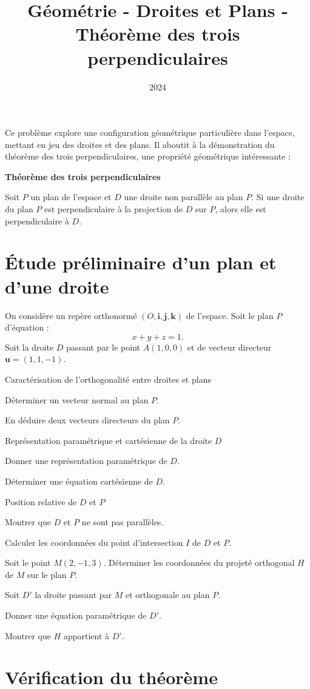 \documentclass[10pt,a4paper]{article}
\title{Géométrie - Droites et Plans - Théorème des trois perpendiculaires}
\author{}
\date{2024}
\begin{document}
Ce problème explore une configuration géométrique particulière dans l'espace, mettant en jeu des
droites et des plans. Il aboutit à la démonstration du théorème des trois perpendiculaires, une
propriété géométrique intéressante :

\begin{center}
\textbf{Théorème des trois perpendiculaires}

Soit $P$ un plan de l'espace et $D$ une droite non parallèle au plan $P$. Si une droite du plan $P$ est
perpendiculaire à la projection de $D$ sur $P$, alors elle est perpendiculaire à $D$.
\end{center}

\section{Étude préliminaire d'un plan et d'une droite}

On considère un repère orthonormé $(O, \mathbf{i}, \mathbf{j}, \mathbf{k})$ de l'espace. Soit le
plan $P$ d'équation :
   \[
   x + y + z = 1.
   \]
Soit la droite $D$ passant par le point $A(1, 0, 0)$ et de vecteur directeur
$\mathbf{u} = (1,1,-1)$.

\q Caractérisation de l'orthogonalité entre droites et plans
\setcounter{ql}{0}

\ql Déterminer un vecteur normal au plan $P$.

\ql En déduire deux vecteurs directeurs du plan $P$.

\q Représentation paramétrique et cartésienne de la droite $D$
\setcounter{ql}{0}

\ql Donner une représentation paramétrique de $D$.

\ql Déterminer une équation cartésienne de $D$.

\q Position relative de $D$ et $P$
\setcounter{ql}{0}

\ql Montrer que $D$ et $P$ ne sont pas parallèles.

\ql Calculer les coordonnées du point d'intersection $I$ de $D$ et $P$.

\q Soit le point $M(2, -1, 3)$. Déterminer les coordonnées du projeté orthogonal $H$ de $M$ sur le
plan $P$.

\q Soit $D'$ la droite passant par $M$ et orthogonale au plan $P$.
\setcounter{ql}{0}

\ql Donner une équation paramétrique de $D'$.

\ql Montrer que $H$ appartient à $D'$.


\section{Vérification du théorème}
\end{document}
